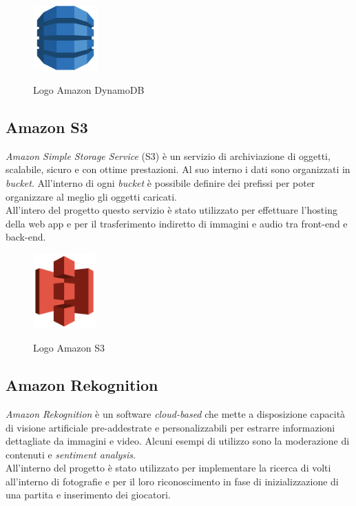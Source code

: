 	\begin{figure}[H]
		\centering
		\includegraphics[width=2.5cm]{immagini/DynamoDB.png} \\
		\caption{\label{fig:logo_dynamoDB} Logo Amazon DynamoDB}
	\end{figure}
	
	\subsection{Amazon S3}
	\emph{Amazon Simple Storage Service} (S3) è un servizio di archiviazione di oggetti, scalabile, sicuro e con ottime prestazioni. Al suo interno i dati sono organizzati in \emph{bucket}. All'interno di ogni \emph{bucket} è possibile definire dei prefissi per poter organizzare al meglio gli oggetti caricati. \\
	All'intero del progetto questo servizio è stato utilizzato per effettuare l’hosting della web app e per il trasferimento indiretto di immagini e audio tra front-end e back-end.
	
	\begin{figure}[H]
		\centering
		\includegraphics[width=2.4cm]{immagini/amazon-s3.png} \\
		\caption{\label{fig:logo_s3} Logo Amazon S3}
	\end{figure}

	
	\subsection{Amazon Rekognition}
	\emph{Amazon Rekognition} è un software \emph{cloud-based} che mette a disposizione capacità di visione artificiale pre-addestrate e personalizzabili per estrarre informazioni dettagliate da immagini e video. Alcuni esempi di utilizzo sono la moderazione di contenuti e \emph{sentiment analysis}.\\ 
	All'interno del progetto è stato utilizzato per implementare la ricerca di volti all'interno di fotografie e per il loro riconoscimento in fase di inizializzazione di una partita e inserimento dei giocatori.
	
